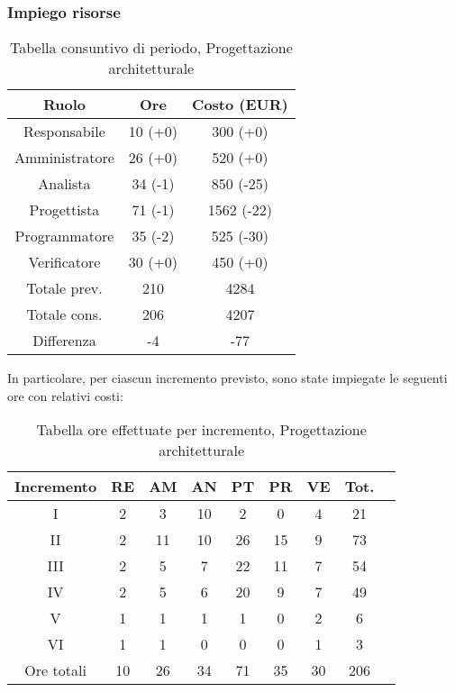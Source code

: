 \subsubsection{Impiego risorse}
\begin{table}[h]
\caption{Tabella consuntivo di periodo, Progettazione architetturale}  
\begin{center}
\begin{tabular}{ |c|c|c|  }
 \hline
 Ruolo 		& Ore & Costo (EUR)\\
 \hline\hline
	Responsabile	& 10 (+0) & 300 (+0)\\
	Amministratore	& 26 (+0) & 520 (+0)\\
	Analista		& 34 (-1) & 850 (-25)\\
	Progettista		& 71 (-1) & 1562 (-22)\\
	Programmatore	& 35 (-2) & 525 (-30)\\
	Verificatore	& 30 (+0) & 450 (+0)\\
	\hline\hline
	Totale prev.	& 210 & 4284 \\
	Totale cons.	& 206 & 4207 \\
	Differenza		& -4 & -77 \\
 \hline
\end{tabular}
\end{center}
\end{table}
\newpage
\noindent In particolare, per ciascun incremento previsto, sono state impiegate le seguenti ore con relativi costi:
\begin{table}[h]
	\caption{Tabella ore effettuate per incremento, Progettazione architetturale}  
	\begin{center}
		\begin{tabular}{ |c|c|c|c|c|c|c|c|c| }
			\hline
			Incremento 		& RE 	& AM 	& AN 	& PT 	& PR 	& VE 	& Tot.\\
			\hline\hline
			I		& 2 		& 3			& 10 	& 2 	& 0 		& 4 		& 21\\
			II		& 2 		& 11 		& 10 	& 26	& 15 		& 9 		& 73\\
			III		& 2 		& 5 		& 7 	& 22	& 11 		& 7 		& 54\\
			IV		& 2 		& 5 		& 6 	& 20 	& 9 		& 7 		& 49\\
			V		& 1 		& 1 		& 1 	& 1		& 0 		& 2	 		& 6\\
			VI		& 1 		& 1 		& 0 	& 0 	& 0 		& 1 		& 3\\
			\hline\hline
			Ore totali		& 10		& 26		& 34 	& 71	 	& 35 	& 30 	& 206\\
			\hline
		\end{tabular}
	\end{center}
\end{table}

